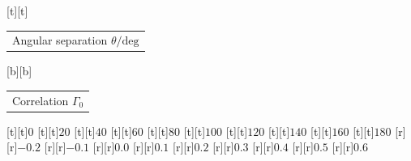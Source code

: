 %    
%
%
\begin{psfrags}%
\psfragscanon%
%
[t][t]{\color[rgb]{0,0,0}\setlength{\tabcolsep}{0pt}\begin{tabular}{c}\Large{}Angular separation $\theta/\mathrm{deg}$\end{tabular}}%
[b][b]{\color[rgb]{0,0,0}\setlength{\tabcolsep}{0pt}\begin{tabular}{c}\Large{}Correlation $\Gamma_0$\end{tabular}}%
%
[t][t]{$0$}%
[t][t]{$20$}%
[t][t]{$40$}%
[t][t]{$60$}%
[t][t]{$80$}%
[t][t]{$100$}%
[t][t]{$120$}%
[t][t]{$140$}%
[t][t]{$160$}%
[t][t]{$180$}%
%
[r][r]{$-0.2$}%
[r][r]{$-0.1$}%
[r][r]{$0.0$}%
[r][r]{$0.1$}%
[r][r]{$0.2$}%
[r][r]{$0.3$}%
[r][r]{$0.4$}%
[r][r]{$0.5$}%
[r][r]{$0.6$}%
%
%
\end{psfrags}%
%
